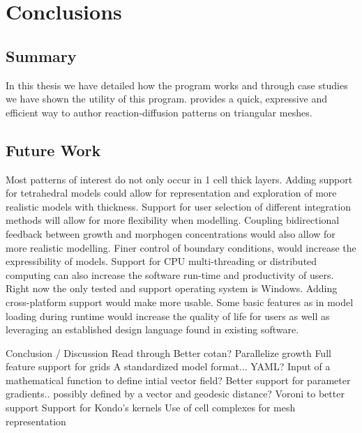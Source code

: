 \chapter{Conclusions}
\section{Summary}
In this thesis we have detailed how the \ProgramName{} program works and through case studies we have shown the utility of this program. \ProgramName{} provides a quick, expressive and efficient way to author reaction-diffusion patterns on triangular meshes. 

\section{Future Work}
Most patterns of interest do not only occur in 1 cell thick layers. Adding support for tetrahedral models could allow for representation and exploration of more realistic models with thickness. Support for user selection of different integration methods will allow for more flexibility when modelling. Coupling bidirectional feedback between growth and morphogen concentrations would also allow for more realistic modelling. Finer control of boundary conditions, would increase the expressibility of models. Support for CPU multi-threading or distributed computing can also increase the software run-time and productivity of users. Right now the only tested and support operating system is Windows. Adding cross-platform support would make \ProgramName{} more usable. Some basic features as in model loading during runtime would increase the quality of life for users as well as leveraging an established design language found in existing software.

Conclusion / Discussion
	Read through
	Better cotan?
	Parallelize growth
	Full feature support for grids
	A standardized model format... YAML?
	Input of a mathematical function to define intial vector field?
	Better support for parameter gradients.. possibly defined by a vector and geodesic distance?
	Voroni to better support
	Support for Kondo's kernels
	Use of cell complexes for mesh representation